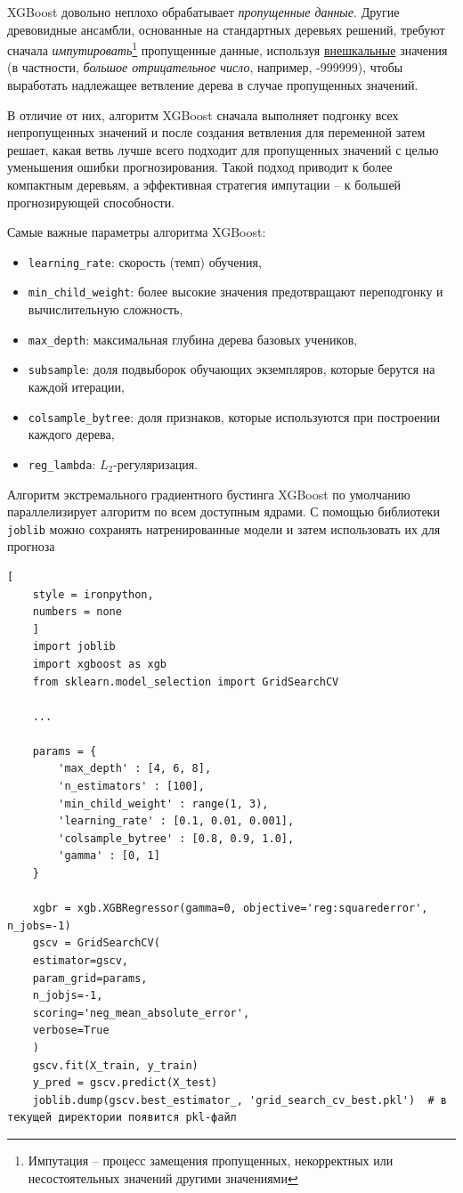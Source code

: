 \documentclass[%
	11pt,
	a4paper,
	utf8,
		]{article}
\begin{document}
XGBoost довольно неплохо обрабатывает \emph{пропущенные данные}. Другие древовидные ансамбли, основанные на стандартных деревьях решений, требуют сначала \emph{импутировать}\footnote{Импутация -- процесс замещения пропущенных, некорректных или несостоятельных значений другими значениями} пропущенные данные, используя \underline{внешкальные} значения (в частности, \emph{большое отрицательное число}, например, -999999), чтобы выработать надлежащее ветвление дерева в случае пропущенных значений.

В отличие от них, алгоритм XGBoost сначала выполняет подгонку всех непропущенных значений и после создания ветвления для переменной затем решает, какая ветвь лучше всего подходит для пропущенных значений с целью уменьшения ошибки прогнозирования. Такой подход приводит к более компактным деревьям, а эффективная стратегия импутации -- к большей прогнозирующей способности.

Самые важные параметры алгоритма XGBoost:
\begin{itemize}
	\item \texttt{learning\_rate}: скорость (темп) обучения, 
	
	\item \texttt{min\_child\_weight}: более высокие значения предотвращают переподгонку и вычислительную сложность,
	
	\item \texttt{max\_depth}: максимальная глубина дерева базовых учеников,
	
	\item \texttt{subsample}: доля подвыборок обучающих экземпляров, которые берутся на каждой итерации,
	
	\item \texttt{colsample\_bytree}: доля признаков, которые используются при построении каждого дерева,
	
	\item \texttt{reg\_lambda}: $ L_2 $-регуляризация.
\end{itemize}

Алгоритм экстремального градиентного бустинга XGBoost по умолчанию параллелизирует алгоритм по всем доступным ядрами. С помощью библиотеки \texttt{joblib} можно сохранять натренированные модели и затем использовать их для прогноза
\begin{lstlisting}[
	style = ironpython,
	numbers = none
	]
	import joblib
	import xgboost as xgb
	from sklearn.model_selection import GridSearchCV
	
	...
	
	params = {
		'max_depth' : [4, 6, 8],
		'n_estimators' : [100],
		'min_child_weight' : range(1, 3),
		'learning_rate' : [0.1, 0.01, 0.001],
		'colsample_bytree' : [0.8, 0.9, 1.0],
		'gamma' : [0, 1]
	}
	
	xgbr = xgb.XGBRegressor(gamma=0, objective='reg:squarederror', n_jobs=-1)
	gscv = GridSearchCV(
	estimator=gscv,
	param_grid=params,
	n_jobjs=-1,
	scoring='neg_mean_absolute_error',
	verbose=True
	)
	gscv.fit(X_train, y_train)
	y_pred = gscv.predict(X_test)
	joblib.dump(gscv.best_estimator_, 'grid_search_cv_best.pkl')  # в текущей директории появится pkl-файл
\end{lstlisting}
\end{document}
